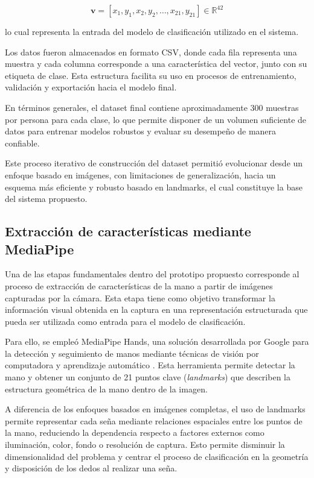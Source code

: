 	\[
	\mathbf{v} = [x_1, y_1, x_2, y_2, \dots, x_{21}, y_{21}] \in \mathbb{R}^{42}
	\]
	
	lo cual representa la entrada del modelo de clasificación utilizado en el sistema.
	
	Los datos fueron almacenados en formato CSV, donde cada fila representa una muestra y cada columna corresponde a una característica del vector, junto con su etiqueta de clase. Esta estructura facilita su uso en procesos de entrenamiento, validación y exportación hacia el modelo final.
	
	En términos generales, el dataset final contiene aproximadamente 300 muestras por persona para cada clase, lo que permite disponer de un volumen suficiente de datos para entrenar modelos robustos y evaluar su desempeño de manera confiable.
	
	Este proceso iterativo de construcción del dataset permitió evolucionar desde un enfoque basado en imágenes, con limitaciones de generalización, hacia un esquema más eficiente y robusto basado en landmarks, el cual constituye la base del sistema propuesto.
	
	\subsection{Extracción de características mediante MediaPipe}
	
	Una de las etapas fundamentales dentro del prototipo propuesto corresponde al
	proceso de extracción de características de la mano a partir de imágenes capturadas
	por la cámara. Esta etapa tiene como objetivo transformar la información visual
	obtenida en la captura en una representación estructurada que pueda ser
	utilizada como entrada para el modelo de clasificación.
	
	Para ello, se empleó MediaPipe Hands, una solución desarrollada por Google para la
	detección y seguimiento de manos mediante técnicas de visión por computadora y
	aprendizaje automático \cite{mediapipe}. Esta herramienta permite detectar la mano
	y obtener un conjunto de 21 puntos clave (\textit{landmarks}) que describen la
	estructura geométrica de la mano dentro de la imagen.
	
	A diferencia de los enfoques basados en imágenes completas, el uso de landmarks
	permite representar cada seña mediante relaciones espaciales entre los puntos de
	la mano, reduciendo la dependencia respecto a factores externos como iluminación,
	color, fondo o resolución de captura. Esto permite disminuir la dimensionalidad
	del problema y centrar el proceso de clasificación en la geometría y disposición
	de los dedos al realizar una seña.
	
